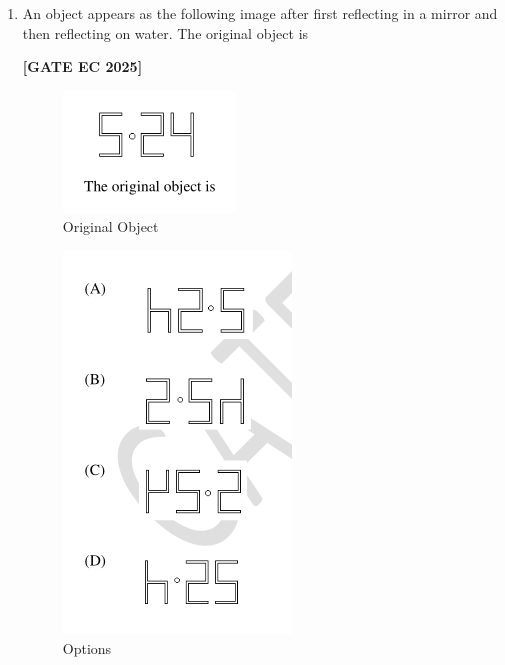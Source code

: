 \documentclass[12pt]{article}
\begin{document}
\begin{enumerate}[leftmargin=1.5em, label=\textbf{Q.\arabic*}., itemsep=2em]
\item An object appears as the following image after first reflecting in a mirror and then reflecting on water.  
The original object is

\noindent \textbf{[GATE EC 2025]}
\begin{figure}[H]\centering
\includegraphics[width=0.7\columnwidth]{figs/q9b.png}
\caption{Original Object}
\label{fig:q9b}
\end{figure}

\begin{figure}[H]\centering
\includegraphics[width=0.7\columnwidth]{figs/q9o.png}
\caption{Options}
\label{fig:q9o}
\end{figure}


\end{enumerate}
\end{document}
